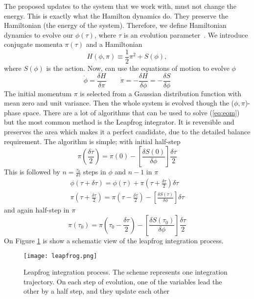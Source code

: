 The proposed updates to the system that we work with, must not change the energy. This is exactly what the Hamilton dynamics do. They preserve the Hamiltonian (the energy of the system). Therefore, we define Hamiltonian dynamics to evolve our $\phi(\tau)$, where $\tau$ is an evolution parameter~\cite{hmc}. We introduce conjugate momenta $\pi(\tau)$ and a Hamiltonian 
\begin{equation}
    H(\phi,\pi) \equiv \frac{1}{2}\pi^2 + S(\phi),
\end{equation}
where $S(\phi)$ is the action. Now, can use the equations of motion to evolve $\phi$
\begin{equation}
    \dot{\phi} = \frac{\delta H}{\delta \pi} \qquad \dot{\pi} = - \frac{\delta H}{\delta \phi} = - \frac{\delta S}{\delta \phi}
    \label{eq:eom}
\end{equation}
The initial momentum $\pi$ is selected from a Gaussian distribution function with mean zero and unit variance. Then the whole system is evolved though the ($\phi,\pi$)-phase space. There are a lot of algorithms that can be used to solve (\ref{eq:eom}) but the most common method is the Leapfrog integrator. It is reversible and preserves the area which makes it a perfect candidate, due to the detailed balance requirement. The algorithm is simple; with initial half-step
\begin{equation}
    \pi\left(\frac{\delta\tau}{2}\right) = \pi\left(0\right) - \left[ \frac{\delta S(0)}{\delta\phi} \right] \frac{\delta\tau}{2}
\end{equation}
This is followed by $n=\frac{\tau_0}{\delta\tau}$ steps in $\phi$ and $n-1$ in $\pi$
\begin{equation}
    \begin{aligned}
        \phi(\tau+\delta\tau) = \phi(\tau) + \pi(\tau+\frac{\delta\tau}{2})\delta\tau
        \\
        \pi(\tau+\frac{\delta\tau}{2}) = \pi(\tau-\frac{\delta\tau}{2}) - \left[ \frac{\delta S(\tau)}{\delta\phi} \right] \delta\tau
    \end{aligned}
\end{equation}
and again half-step in $\pi$
\begin{equation}
    \pi(\tau_0) = \pi(\tau_0-\frac{\delta\tau}{2}) - \left[ \frac{\delta S(\tau_0)}{\delta\phi} \right] \frac{\delta\tau}{2}
\end{equation}
On Figure \ref{fig:leapfrog} is show a schematic view of the leapfrog integration process.
\begin{figure}[htbp]
    \centerline{\texttt{[image: leapfrog.png]}}
    \caption{Leapfrog integration process. The scheme represents one integration trajectory. On each step of evolution, one of the variables lead the other by a half step, and they update each other~\cite{pic-leapfrog}
    }
    \label{fig:leapfrog}
\end{figure}

